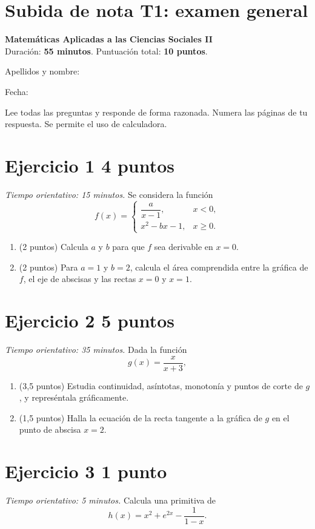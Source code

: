 \documentclass[12pt]{article}
\begin{document}
\section*{Subida de nota T1: examen general}
\textbf{Matemáticas Aplicadas a las Ciencias Sociales II}\\
Duración: \textbf{55 minutos}. Puntuación total: \textbf{10 puntos}.

Apellidos y nombre: \hrulefill

Fecha: \hrulefill

Lee todas las preguntas y responde de forma razonada. Numera las páginas de tu respuesta. Se permite el uso de calculadora.
\section*{Ejercicio 1 \hfill 4 puntos}
\textit{Tiempo orientativo: 15 minutos.} Se considera la función
\[
f(x)=\begin{cases}\dfrac{a}{x-1},&x<0,\\x^2-bx-1,&x\geq0.\end{cases}
\]
\begin{enumerate}[label=(\alph*)]
\item (2 puntos) Calcula $a$ y $b$ para que $f$ sea derivable en $x=0$.
\item (2 puntos) Para $a=1$ y $b=2$, calcula el área comprendida entre la gráfica de $f$, el eje de abscisas y las rectas $x=0$ y $x=1$.
\end{enumerate}
\section*{Ejercicio 2 \hfill 5 puntos}
\textit{Tiempo orientativo: 35 minutos.} Dada la función
\[g(x)=\frac{x}{x+3},\]
\begin{enumerate}[label=(\alph*)]
\item (3,5 puntos) Estudia continuidad, asíntotas, monotonía y puntos de corte de $g$, y represéntala gráficamente.
\item (1,5 puntos) Halla la ecuación de la recta tangente a la gráfica de $g$ en el punto de abscisa $x=2$.
\end{enumerate}
\section*{Ejercicio 3 \hfill 1 punto}
\textit{Tiempo orientativo: 5 minutos.} Calcula una primitiva de
\[h(x)=x^2+e^{2x}-\frac{1}{1-x}.\]
\end{document}
